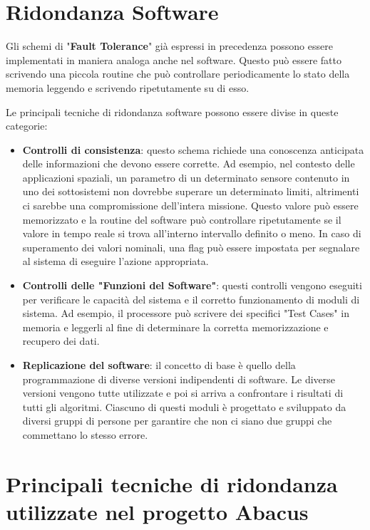 \documentclass[LaM,binding=0.6cm]{../sapthesis}
\begin{document}
\section{ Ridondanza Software}
Gli schemi di "\textbf{Fault Tolerance}" già espressi in precedenza possono essere implementati in maniera analoga anche nel software.
Questo può essere fatto scrivendo una piccola routine che può controllare periodicamente lo stato della memoria
leggendo e scrivendo ripetutamente su di esso. 


Le principali tecniche di ridondanza software possono essere divise in queste categorie:
\begin{itemize}
    \item \textbf{Controlli di consistenza}: questo schema richiede una conoscenza anticipata delle informazioni che devono essere corrette. Ad esempio, nel contesto delle applicazioni spaziali, un parametro di un determinato sensore contenuto in uno dei sottosistemi non dovrebbe superare un determinato limiti, altrimenti ci sarebbe una compromissione dell'intera missione. Questo valore può essere memorizzato e la routine del software può controllare ripetutamente se il valore in tempo reale si trova all'interno intervallo definito o meno. In caso di superamento dei valori nominali, una flag può essere impostata per segnalare al sistema di eseguire l'azione appropriata.
    
    \item \textbf{Controlli delle "Funzioni del Software"}: questi controlli vengono eseguiti per verificare le capacità del sistema e il corretto funzionamento di moduli di sistema. Ad esempio, il processore può scrivere dei specifici "Test Cases" in memoria e
    leggerli al fine di determinare la corretta memorizzazione e recupero dei dati.

    \item \textbf{Replicazione del software}: il concetto di base è quello della programmazione di diverse versioni indipendenti di software.
    Le diverse versioni vengono tutte utilizzate e poi si arriva a confrontare i risultati di tutti gli algoritmi. Ciascuno di questi moduli è progettato e sviluppato da
    diversi gruppi di persone per garantire che non ci siano due gruppi che commettano lo stesso errore.

\end{itemize}

\section{Principali tecniche di ridondanza utilizzate nel progetto Abacus}
\end{document}
